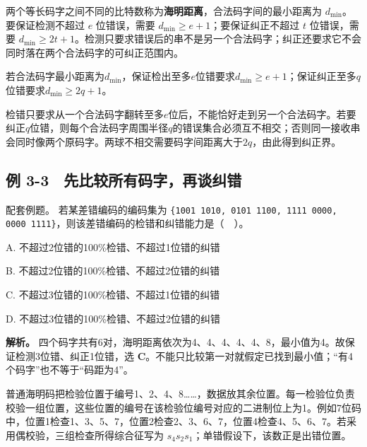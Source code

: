 两个等长码字之间不同的比特数称为\textbf{海明距离}，合法码字间的最小距离为 \(d_{\min}\)。要保证检测不超过 \(e\) 位错误，需要 \(d_{\min}\ge e+1\)；要保证纠正不超过 \(t\) 位错误，需要 \(d_{\min}\ge2t+1\)。检测只要求错误后的串不是另一个合法码字；纠正还要求它不会同时落在两个合法码字的可纠正范围内。

\begin{theorem}[最小码距的检测与纠正界]

若合法码字最小距离为\(d_{\min}\)，保证检出至多\(e\)位错要求\(d_{\min}\ge e+1\)；保证纠正至多\(q\)位错要求\(d_{\min}\ge2q+1\)。

\end{theorem}

检错只要求从一个合法码字翻转至多\(e\)位后，不能恰好走到另一个合法码字。若要纠正\(q\)位错，则每个合法码字周围半径\(q\)的错误集合必须互不相交；否则同一接收串会同时像两个原码字。两球不相交需要码字间距离大于\(2q\)，由此得到纠正界。

\subsection{例 3-3　先比较所有码字，再谈纠错}\label{CN03-ex3}

{\begin{example}[配套例题]

配套例题。 若某差错编码的编码集为 \texttt{\{1001 1010,\allowbreak{} 0101 1100,\allowbreak{} 1111 0000,\allowbreak{} 0000 1111\}}，则该差错编码的检错和纠错能力是（　）。

A. 不超过2位错的100\%检错、不超过1位错的纠错

B. 不超过2位错的100\%检错、不超过2位错的纠错

C. 不超过3位错的100\%检错、不超过1位错的纠错

D. 不超过3位错的100\%检错、不超过2位错的纠错

\end{example}}

\textbf{解析。} 四个码字共有6对，海明距离依次为4、4、4、4、4、8，最小值为4。故保证检测3位错、纠正1位错，选 \textbf{C}。不能只比较第一对就假定已找到最小值；``有4个码字''也不等于``码距为4''。

普通海明码把检验位置于编号1、2、4、8\ldots\ldots，数据放其余位置。每一检验位负责校验一组位置，这些位置的编号在该检验位编号对应的二进制位上为1。例如7位码中，位置1检查1、3、5、7，位置2检查2、3、6、7，位置4检查4、5、6、7。若采用偶校验，三组检查所得综合征写为 \(s_4s_2s_1\)；单错假设下，该数正是出错位置。


